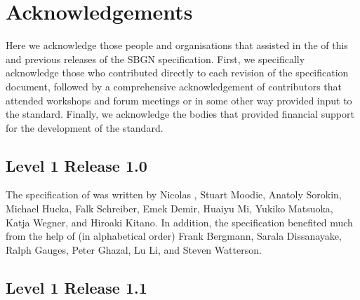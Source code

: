 \chapter{Acknowledgements}\label{sec:acknowledgements}

Here we acknowledge those people and organisations that assisted in the  of this and previous releases of the SBGN \PDl specification. First, we specifically acknowledge those who contributed directly to each revision of the  specification document, followed by a comprehensive acknowledgement of contributors that attended workshops and forum meetings or in some other way provided input to the standard. Finally, we acknowledge the bodies that provided financial support for the development of the standard.



\section{Level 1 Release 1.0}

The specification of was written by Nicolas \lenov{}, 
Stuart Moodie, Anatoly Sorokin, Michael Hucka, Falk Schreiber, Emek Demir, 
Huaiyu Mi, Yukiko Matsuoka, Katja Wegner, and Hiroaki Kitano. In addition, 
the specification benefited much from the help of (in alphabetical order) Frank Bergmann, Sarala 
Dissanayake, Ralph Gauges, Peter Ghazal, Lu Li, and Steven Watterson.


\section{Level 1 Release 1.1}

